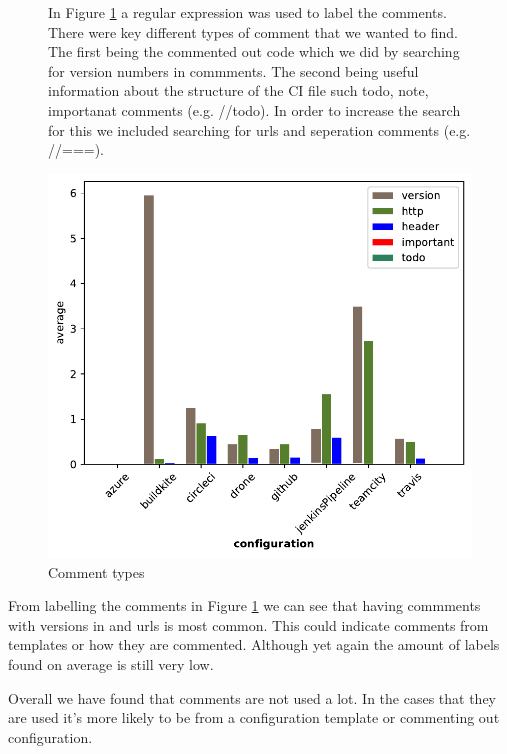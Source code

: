 \documentclass[twoside,12pt,titlepage,a4paper]{article}
\begin{document}
\begin{figure}[!ht]
  \centering
  \begin{minipage}[!t]{.48\textwidth}
    In Figure \ref{fig:comment_types} a regular expression was used to label the comments. There were key different types of comment that we wanted to find. The first being the commented out code which we did by searching for version numbers in commments. The second being useful information about the structure of the CI file such todo, note, importanat comments (e.g. //todo). In order to increase the search for this we included searching for urls and seperation comments (e.g. //===).
    
  \end{minipage}%
  \hfill
  \begin{minipage}[!t]{.48\textwidth}
    \includegraphics[width=\textwidth]{../src/results/comments usage bars.pdf}
    \caption[alt text]{Comment types}
    \label{fig:comment_types}  
  \end{minipage}
\end{figure}

From labelling the comments in Figure \ref{fig:comment_types} we can see that having commments with versions in and urls is most common. This could indicate comments from templates or how they are commented. Although yet again the amount of labels found on average is still very low.

Overall we have found that comments are not used a lot. In the cases that they are used it's more likely to be from a configuration template or commenting out configuration.
\end{document}
